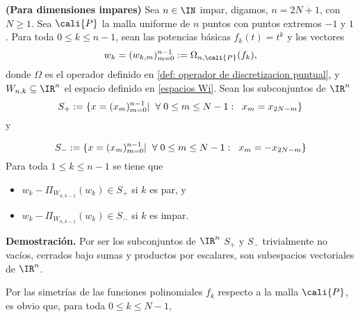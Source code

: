\begin{prop}
\label{prop: para las simetrias en dimensiones impares}
\textbf{(Para dimensiones impares)}
Sea $n \in \IN$ impar, digamos,
$n=2N+1$, con $N \geq 1$. 
Sea $\cali{P}$ la malla
uniforme de $n$ puntos con puntos extremos $-1$ y $1$.
Para toda $0 \leq k \leq n-1$, sean
las potencias básicas $f_{k}(t)=t^{k}$ y los vectores
\begin{equation}
\label{eq4: 10Dic}
w_{k}=(w_{k,m})_{m=0}^{n-1} := \Omega_{n, \cali{P}}(f_{k}),
\end{equation}
donde $\Omega$ es el operador definido en 
\ref{def: operador de discretizacion puntual}, 
y $W_{n,k} \subseteq \IR^{n}$ 
el espacio definido en \ref{espacios Wi}.
Sean los subconjuntos de $\IR^{n}$
\begin{equation}
\label{eq0: 5Dic}
S_{+}:= \{ x=(x_{m})_{m=0}^{n-1}| \hspace{0.2cm} \forall  
\hspace{0.1cm}
0 \leq m \leq N-1 : \hspace{0.2cm} x_{m}= x_{2N-m}\}
\end{equation}
y

\begin{equation}
\label{eq1: 5Dic}
S_{-}:= \{ x=(x_{m})_{m=0}^{n-1}| \hspace{0.2cm} \forall  
\hspace{0.1cm}
0 \leq m \leq N-1 : \hspace{0.2cm} x_{m}= -x_{2N-m}\}
\end{equation}
Para toda $1 \leq k \leq n-1$
se tiene que
\begin{itemize}
\item $w_{k}- \Pi_{W_{n,k-1}}(w_{k}) \in S_{+}$ si $k$ es par, y
\item $w_{k}- \Pi_{W_{n,k-1}}(w_{k}) \in S_{-}$ si $k$ es impar.
\end{itemize}
\end{prop}
\noindent
\textbf{Demostración.}
Por ser los subconjuntos
de $\IR^{n}$ $S_{+}$ y $S_{-}$ trivialmente
no vacíos, cerrados bajo sumas
y productos por escalares, son subespacios
vectoriales de $\IR^{n}$. 

Por las simetrías de las funciones polinomiales
$f_{k}$ respecto a la malla $\cali{P}$, es obvio que,
para toda $0 \leq k \leq N-1$,

